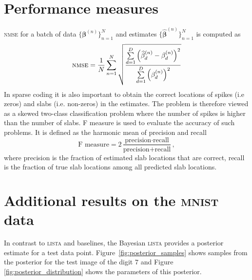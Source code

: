\documentclass{article}
\begin{document}
\section{Performance measures}
\textsc{nmse} for a batch of data $\{\boldsymbol\beta^{(n)}\}_{n=1}^{N}$ and estimates $\{\widehat{\boldsymbol\beta}^{(n)}\}_{n=1}^{N}$ is computed as
\begin{equation}
\text{\textsc{nmse}} = \frac{1}{N}\sum\limits_{n=1}^N\sqrt{\frac{\sum\limits_{d=1}^D\left(\widehat{\beta}_{d}^{(n)} - \beta_d^{(n)}\right)^2}{\sum\limits_{d=1}^D\left(\beta_{d}^{(n)}\right)^2}}
\end{equation}
In sparse coding it is also important to obtain the correct locations of spikes (i.e zeros) and slabs (i.e. non-zeros) in the estimates. The problem is therefore viewed as a skewed two-class classification problem where the number of spikes is higher than the number of slabs. F measure is used to evaluate the accuracy of such problems. It is defined as the harmonic mean of precision and recall
\begin{equation}
\text{F measure} = 2\dfrac{\text{precision}\cdot\text{recall}}{\text{precision} + \text{recall}},
\end{equation}
where precision is the fraction of estimated slab locations that are correct, recall is the fraction of true slab locations among all predicted slab locations.

\section{Additional results on the \textsc{mnist} data}
In contrast to \textsc{lista} and baselines, the Bayesian \textsc{lista} provides a posterior estimate for a test data point. Figure~\ref{fig:posterior_samples} shows samples from the posterior for the test image of the digit $7$ and Figure \ref{fig:posterior_distribution} shows the parameters of this posterior.
\end{document}

